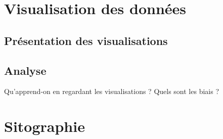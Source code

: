 \documentclass[hidelinks, 12pt]{article}
\begin{document}
\section{Visualisation des données}

\subsection{Présentation des visualisations}

\subsection{Analyse}

Qu'apprend-on en regardant les visualisations ? Quels sont les biais ?
\newpage


\section{Sitographie}
\printbibliography[heading=none]
\newpage

\tableofcontents
\end{document}
